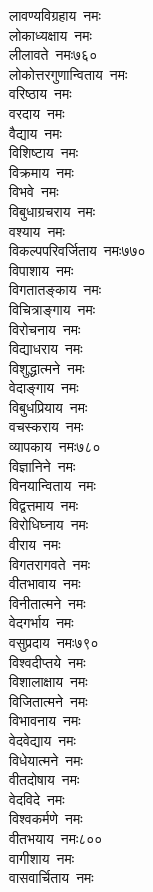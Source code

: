 \begin{multicols}{\maxColumns}
\begin{flushleft}
लावण्यविग्रहाय~नमः\\
लोकाध्यक्षाय~नमः\\
लीलावते~नमः\hfill ७६०\\
लोकोत्तरगुणान्विताय~नमः\\
वरिष्ठाय~नमः\\
वरदाय~नमः\\
वैद्याय~नमः\\
विशिष्टाय~नमः\\
विक्रमाय~नमः\\
विभवे~नमः\\
विबुधाग्रचराय~नमः\\
वश्याय~नमः\\
विकल्पपरिवर्जिताय~नमः\hfill ७७०\\
विपाशाय~नमः\\
विगतातङ्काय~नमः\\
विचित्राङ्गाय~नमः\\
विरोचनाय~नमः\\
विद्याधराय~नमः\\
विशुद्धात्मने~नमः\\
वेदाङ्गाय~नमः\\
विबुधप्रियाय~नमः\\
वचस्कराय~नमः\\
व्यापकाय~नमः\hfill ७८०\\
विज्ञानिने~नमः\\
विनयान्विताय~नमः\\
विद्वत्तमाय~नमः\\
विरोधिघ्नाय~नमः\\
वीराय~नमः\\
विगतरागवते~नमः\\
वीतभावाय~नमः\\
विनीतात्मने~नमः\\
वेदगर्भाय~नमः\\
वसुप्रदाय~नमः\hfill ७९०\\
विश्वदीप्तये~नमः\\
विशालाक्षाय~नमः\\
विजितात्मने~नमः\\
विभावनाय~नमः\\
वेदवेद्याय~नमः\\
विधेयात्मने~नमः\\
वीतदोषाय~नमः\\
वेदविदे~नमः\\
विश्वकर्मणे~नमः\\
वीतभयाय~नमः\hfill ८००\\
वागीशाय~नमः\\
वासवार्चिताय~नमः\\

\end{flushleft}
\end{multicols}
